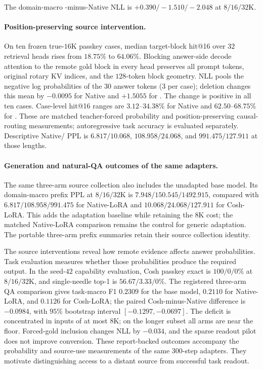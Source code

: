 The domain-macro \evq{}-minus-Native NLL is
$+0.390/-1.510/-2.048$ at $8$/$16$/$32$K.

\paragraph{Position-preserving source intervention.}
On ten frozen true-$16$K
passkey cases, median target-block hit@16 over $32$ retrieval heads rises from
$18.75\%$ to $64.06\%$. Blocking answer-side decode attention to the remote
gold block in every head preserves all prompt tokens, original rotary KV
indices, and the $128$-token block geometry. NLL pools the negative log
probabilities of the $30$ answer tokens ($3$ per case); deletion changes this
mean by $-0.0095$ for Native and $+1.5055$ for \evq{}. The \evq{} change is
positive in all ten cases. Case-level hit@16 ranges are $3.12$--$34.38\%$
for Native and $62.50$--$68.75\%$ for \evq{}.
These are matched teacher-forced probability
and position-preserving causal-routing measurements; autoregressive task
accuracy is evaluated separately. Descriptive Native/\evq{} PPL is
$6.817/10.068$, $108.958/24.068$, and $991.475/127.911$ at those lengths.


\paragraph{Generation and natural-QA outcomes of the same adapters.}
The same three-arm source collection also includes the unadapted base model. Its domain-macro prefix PPL at $8/16/32$K is $7.948/150.545/1492.915$, compared with $6.817/108.958/991.475$ for Native-LoRA and $10.068/24.068/127.911$ for Cosh-LoRA. This adds the adaptation baseline while retaining the $8$K cost; the matched Native-LoRA comparison remains the control for generic adaptation. The portable three-arm prefix summaries retain their source collection identity.

The source interventions reveal how remote evidence affects answer probabilities. Task evaluation measures whether those probabilities produce the required output. In the seed-$42$ capability evaluation, Cosh passkey exact is $100/0/0\%$ at $8/16/32$K, and single-needle top-1 is $56.67/3.33/0\%$. The registered three-arm QA comparison gives task-macro F1 $0.2309$ for the base model, $0.2110$ for Native-LoRA, and $0.1126$ for Cosh-LoRA; the paired Cosh-minus-Native difference is $-0.0984$, with $95\%$ bootstrap interval $[-0.1297,-0.0697]$. The deficit is concentrated in inputs of at most $8$K; on the longer subset all arms are near the floor. Forced-gold inclusion changes NLL by $-0.034$, and the sparse readout pilot does not improve conversion. These report-backed outcomes accompany the probability and source-use measurements of the same $300$-step adapters. They motivate distinguishing access to a distant source from successful task readout.

